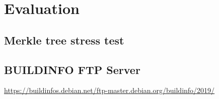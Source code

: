 \documentclass[../Main/thesis.tex]{subfiles}
\begin{document}
\chapter{Evaluation}%
\label{appendix:evaluation}

\section{Merkle tree stress test}%
\label{appendix:merkle_tree_stress_test}

\section{BUILDINFO FTP Server}%
\label{appendix:buildinfo_ftp_server}
\url{https://buildinfos.debian.net/ftp-master.debian.org/buildinfo/2019/}
\end{document}
